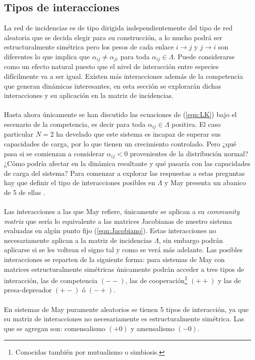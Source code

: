 \subsection{Tipos de interacciones}

La red de incidencias es de tipo dirigida independientemente del tipo de red aleatoria que se decida elegir para su construcción, a lo mucho podrá ser estructuralmente simétrica pero los pesos de cada enlace $i\to j$ y $j\to i$ son diferentes lo que implica que $\alpha_{ij}\neq\alpha_{ji}$ para toda $\alpha_{ij}\in\Lambda$. Puede considerarse como un efecto natural puesto que el nivel de interacción entre especies difícilmente va a ser igual. Existen más interacciones además de la competencia que generan dinámicas interesantes, en esta sección se explorarán dichas interacciones y su aplicación en la matriz de incidencias.
\\
\\
Hasta ahora únicamente se han discutido las ecuaciones de (\ref{eqn:LK}) bajo el escenario de la competencia, es decir para toda $\alpha_{ij}\in\Lambda$ positiva. El caso particular $N=2$ ha develado que este sistema es incapaz de superar sus capacidades de carga, por lo que tienen un crecimiento controlado. Pero ¿qué pasa si se comienzan a considerar $\alpha_{ij}<0$ provenientes de la distribución normal? ¿Cómo podría afectar en la dinámica resultante y qué pasaría con las capacidades de carga del sistema? Para comenzar a explorar las respuestas a estas preguntas hay que definir el tipo de interacciones posibles en $\Lambda$ y May presenta un abanico de 5 de ellas \cite{may2019stability}.\\
\\
Las interacciones a las que May refiere, únicamente se aplican a su \textit{community matrix} que sería lo equivalente a las matrices Jacobianas de nuestro sistema evaluadas en algún punto fijo (\ref{eqn:Jacobiano}). Estas interacciones no necesariamente aplican a la matriz de incidencias $\Lambda$, sin embargo podrán aplicarse  si se les voltean el signo tal y como se verá más adelante. Las posibles interacciones se reparten de la siguiente forma: para sistemas de May con matrices estructuralmente simétricas únicamente podrán acceder a tres tipos de interacción, las de competencia $(--)$, las de cooperación\footnote{Conocidas también por mutualismo o simbiosis.} $(++)$ y las de presa-depreador $(+-)$ ó $(-+)$.
\\
\\
En sistemas de May puramente aleatorios se tienen 5 tipos de interacción, ya que su matriz de interacciones no necesariamente es estructuralmente simétrica. Las que se agregan son: comensalismo $(+0)$ y amensalismo $(-0)$. \\
